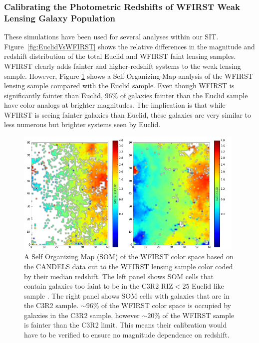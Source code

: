 \subsubsection{Calibrating the Photometric Redshifts of WFIRST Weak Lensing Galaxy Population}

These simulations have been used for several analyses within our SIT.  Figure~\ref{fig:EuclidVsWFIRST} shows the relative differences in the magnitude and
redshift distribution of the total Euclid and WFIRST faint lensing samples.
WFIRST clearly adds fainter and higher-redshift systems to the weak lensing
sample.  However, Figure \ref{fig:WFIRSTSOM} shows a Self-Organizing-Map
analysis \citep{Masters2015} of the WFIRST lensing sample compared with the
Euclid sample. Even though WFIRST is significantly fainter than Euclid, 96\% of
galaxies fainter than the Euclid sample have color analogs at brighter
magnitudes.  The implication is that while WFIRST is seeing fainter galaxies
than Euclid, these galaxies are very similar to less numerous but brighter
systems seen by Euclid.

\begin{figure}
\centering
 \includegraphics[trim=0cm 0cm 0cm 0cm, clip,width=0.98\textwidth] {Plots/SOM_WFIRST_EUCLID.png}
\caption{A Self Organizing Map (SOM) \citep{Masters2015} of the WFIRST color
space based on the CANDELS data cut to the WFIRST lensing sample color coded by
their median redshift.  The left panel shows SOM cells that contain galaxies too
faint to be in the C3R2 RIZ$<25$ Euclid like sample
\citep{Masters2015,Masters2017}.  The right panel shows SOM cells with galaxies
that are in the C3R2 sample.  $\sim96\%$ of the WFIRST color space is occupied
by galaxies in the C3R2 sample, however $\sim20\%$ of the WFIRST sample is
fainter than the C3R2 limit.  This means their calibration would have to be
verified to ensure no magnitude dependence on redshift. }
\label{fig:WFIRSTSOM}
\end{figure}

